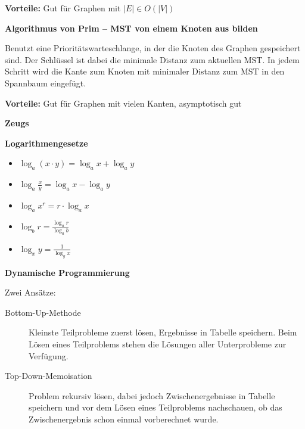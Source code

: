 \documentclass{letter}
\newcommand{\noplus}{}
\newcommand{\paragraph}[1]{\smallskip

\noindent\textbf{#1}}
\newcommand{\subsection}[1]{\medskip\bigskip

\noindent\textbf{\Large #1}}
\newcommand{\subsubsection}[1]{\medskip\bigskip

\noindent\textbf{\large #1}}
\newcommand{\tmstrong}[1]{\textbf{#1}}
\begin{document}
{\tmstrong{Vorteile:}} Gut f\"ur Graphen mit $\left| E \right| \in O \left(
\left| V \right| \right)$

\paragraph{Algorithmus von Prim -- MST von einem Knoten aus bilden}

Benutzt eine Priorit\"atswarteschlange, in der die Knoten des Graphen
gespeichert sind. Der Schl\"ussel ist dabei die minimale Distanz zum aktuellen
MST. In jedem Schritt wird die Kante zum Knoten mit minimaler Distanz zum MST
in den Spannbaum eingef\"ugt.

{\tmstrong{Vorteile:}} Gut f\"ur Graphen mit vielen Kanten, asymptotisch gut

\subsection{Zeugs}

\subsubsection{Logarithmengesetze}

\begin{itemize}
  \item $\log_a  \left( x \cdot y \right) = \log_a x \noplus + \log_a y$
  
  \item $\log_a \frac{x}{y} = \log_a x - \log_a y$
  
  \item $\log_a x^r = r \cdot \log_a x$
  
  \item $\log_b r = \frac{\log_a r}{\log_a b}$
  
  \item $\log_x y = \frac{1}{\log_y x}$
\end{itemize}

\subsubsection{Dynamische Programmierung}

Zwei Ans\"atze:
\begin{description}
  \item[Bottom-Up-Methode] Kleinste Teilprobleme zuerst l\"osen, Ergebnisse in
  Tabelle speichern. Beim L\"osen eines Teilproblems stehen die L\"osungen
  aller Unterprobleme zur Verf\"ugung.
  
  \item[Top-Down-Memoisation] Problem rekursiv l\"osen, dabei jedoch
  Zwischenergebnisse in Tabelle speichern und vor dem L\"osen eines
  Teilproblems nachschauen, ob das Zwischenergebnis schon einmal vorberechnet
  wurde.
\end{description}
\end{document}
